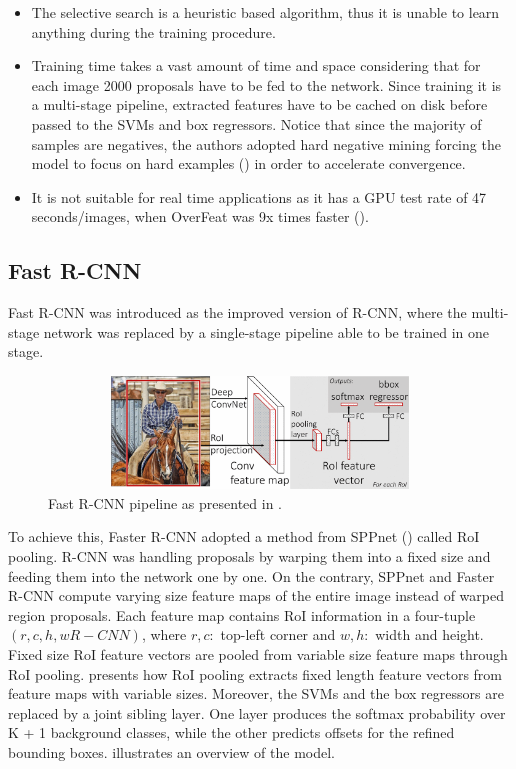\begin{itemize}
  \item The selective search is a heuristic based algorithm, thus it is unable to learn anything during the training procedure. 
  \item Training time takes a vast amount of time and space considering that for each image 2000 proposals have to be fed to the network. Since training it is a multi-stage pipeline, extracted features have to be cached on disk before passed to the SVMs and box regressors. Notice that since the majority of samples are negatives, the authors adopted hard negative mining forcing the model to focus on hard examples (\cite{felzenszwalb2009object}) in order to accelerate convergence.
  \item It is not suitable for real time applications as it has a GPU test rate of  47 seconds/images, when OverFeat was 9x times faster (\cite{girshick2015fast}). 
\end{itemize}

\subsection{Fast R-CNN}
Fast R-CNN was introduced as the improved version of R-CNN, where the multi-stage network was replaced by a single-stage pipeline able to be trained in one stage.

\begin{figure}[!htb]
  \centering
  \includegraphics[width=12cm, height=3cm]{../figures/ch2/fig3.png}
  \caption{Fast R-CNN pipeline as presented in \cite{girshick2015fast}.}
  \label{fig3}
\end{figure}

To achieve this, Faster R-CNN adopted a method from SPPnet (\cite{he2015spatial}) called RoI pooling. R-CNN was handling proposals by warping them into a fixed size and feeding them into the network one by one. On the contrary, SPPnet and Faster R-CNN compute varying size feature maps of the entire image instead of warped region proposals. Each feature map contains RoI information in a four-tuple $(r,c,h,wR-CNN)$, where $r, c:$ top-left corner and $w, h:$ width and height. Fixed size RoI feature vectors are pooled from variable size feature maps through RoI pooling.  presents how RoI pooling extracts fixed length feature vectors from feature maps with variable sizes. Moreover, the SVMs and the box regressors are replaced by a joint sibling layer. One layer produces the softmax probability over K + 1 background classes, while the other predicts offsets for the refined bounding boxes.  illustrates an overview of the model. 


